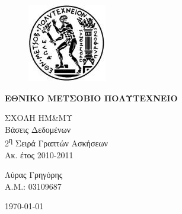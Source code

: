 \begin{titlepage}
\begin{center}
\begin{figure}[t] 
     \includegraphics[scale=0.7]{title/ntua_logo}
\end{figure}
\begin{LARGE}\textbf{ΕΘΝΙΚΟ ΜΕΤΣΟΒΙΟ ΠΟΛΥΤΕΧΝΕΙΟ\\}\end{LARGE}
\vspace{5cm}
\begin{Large}
ΣΧΟΛΗ ΗΜ\&ΜΥ\\
Βάσεις Δεδομένων\\
2\textsuperscript{η} Σειρά Γραπτών Ασκήσεων\\
Ακ. έτος 2010-2011\\
\end{Large}
\vfill
\begin{flushright}
\Large{Λύρας Γρηγόρης}\\
\large{Α.Μ.: 03109687}\\
\end{flushright}
\large\today\\
\end{center}
\end{titlepage}

